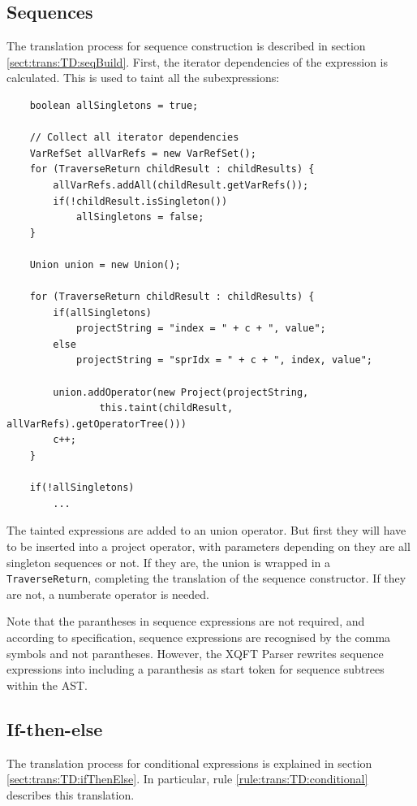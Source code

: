 \subsection{Sequences}
\label{sect:impl:td:seq}
The translation process for sequence construction is described in section
\ref{sect:trans:TD:seqBuild}. First, the iterator dependencies of the expression is calculated. This is used to
taint all the subexpressions:

\begin{Verbatim}
    boolean allSingletons = true;    

    // Collect all iterator dependencies
    VarRefSet allVarRefs = new VarRefSet();
    for (TraverseReturn childResult : childResults) {
        allVarRefs.addAll(childResult.getVarRefs());
        if(!childResult.isSingleton())
            allSingletons = false;
    }

    Union union = new Union();

    for (TraverseReturn childResult : childResults) {
        if(allSingletons)
            projectString = "index = " + c + ", value";
        else
            projectString = "sprIdx = " + c + ", index, value";

        union.addOperator(new Project(projectString, 
                this.taint(childResult, allVarRefs).getOperatorTree()))
        c++;    
    }
    
    if(!allSingletons)
        ...
\end{Verbatim}

The tainted expressions are added to an \textsf{union} operator. But first they will have to be inserted into a
\textsf{project} operator, with parameters depending on they are all singleton sequences or not. If they are, the
union is wrapped in a \texttt{TraverseReturn}, completing the translation of the sequence constructor. If they are
not, a \textsf{numberate} operator is needed.

Note that the parantheses in sequence expressions are not required, and
according to specification, sequence expressions are recognised by the comma
symbols and not parantheses. However, the XQFT Parser rewrites sequence
expressions into including a paranthesis as start token for sequence subtrees
within the AST.

\subsection{If-then-else}
The translation process for conditional expressions is explained in section
\ref{sect:trans:TD:ifThenElse}. In particular, rule
\ref{rule:trans:TD:conditional} describes this translation. 
%         

